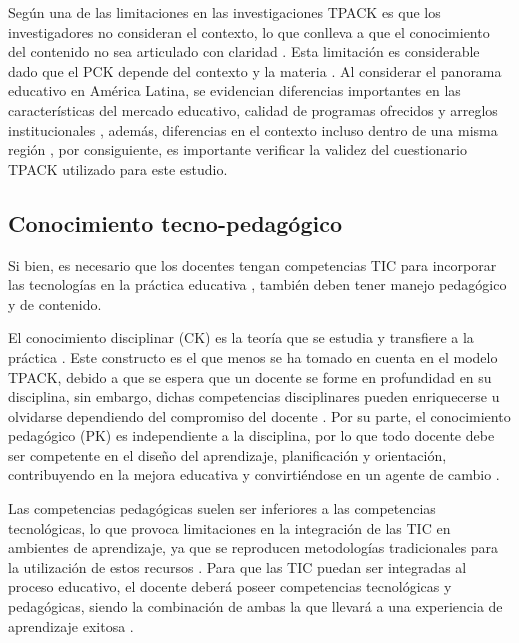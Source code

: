 \documentclass[spanish]{textolivre}
\begin{document}
Según \textcite[p. 1610]{khine_exploring_2017} una de las limitaciones en las investigaciones TPACK es que los investigadores no consideran el contexto, lo que conlleva a que el conocimiento del contenido no sea articulado con claridad \cite{chai_validating_2013,voogt_technological_2013}. Esta limitación es considerable dado que el PCK depende del contexto y la materia \cite{shulman_those_1986,shulman_knowledge_1987}. Al considerar el panorama educativo en América Latina, se evidencian diferencias importantes en las características del mercado educativo, calidad de programas ofrecidos y arreglos institucionales \cite[p. 99]{gamboa_existen_2016}, además, diferencias en el contexto incluso dentro de una misma región \cite[p. 3]{tomaselli_pobreza_2014}, por consiguiente, es importante verificar la validez del cuestionario TPACK utilizado para este estudio.

\subsection{Conocimiento tecno-pedagógico}\label{sec-fmt-manuscrito}
Si bien, es necesario que los docentes tengan competencias TIC para incorporar las tecnologías en la práctica educativa \cite{suarez_rodriguez_competencias_2013}, también deben tener manejo pedagógico y de contenido.

El conocimiento disciplinar (CK) es la teoría que se estudia y transfiere a la práctica \cite[p. 7]{senge_quinta_1996}. Este constructo es el que menos se ha tomado en cuenta en el modelo TPACK, debido a que se espera que un docente se forme en profundidad en su disciplina, sin embargo, dichas competencias disciplinares pueden enriquecerse u olvidarse dependiendo del compromiso del docente \cite[p. 110]{cejas_leon_competencias_2016}. Por su parte, el conocimiento pedagógico (PK) es independiente a la disciplina, por lo que todo docente debe ser competente en el diseño del aprendizaje, planificación y orientación, contribuyendo en la mejora educativa y convirtiéndose en un agente de cambio \cite[p. 112]{cejas_leon_competencias_2016}.

Las competencias pedagógicas suelen ser inferiores a las competencias tecnológicas, lo que provoca limitaciones en la integración de las TIC en ambientes de aprendizaje, ya que se reproducen metodologías tradicionales para la utilización de estos recursos \cite{cabero_formacion_2014,suarez_rodriguez_competencias_2013}. Para que las TIC puedan ser integradas al proceso educativo, el docente deberá poseer competencias tecnológicas y pedagógicas, siendo la combinación de ambas la que llevará a una experiencia de aprendizaje exitosa \cite[107]{cejas_leon_competencias_2016}.
\end{document}
